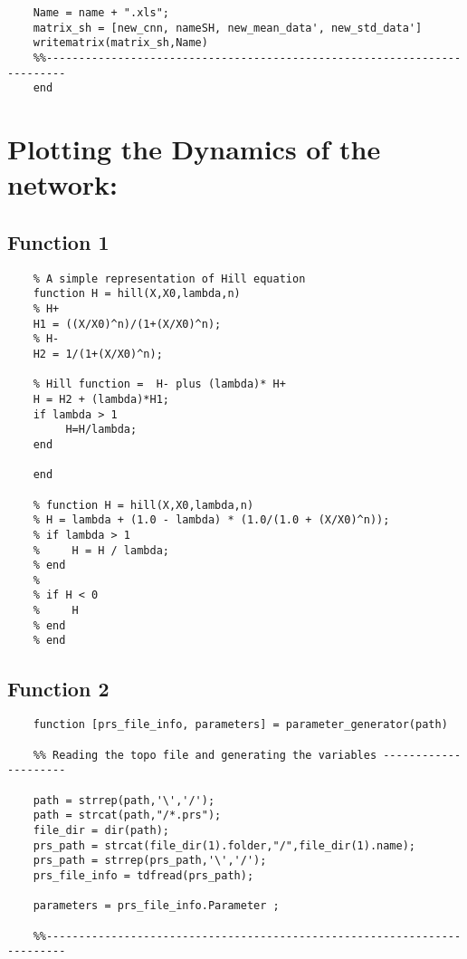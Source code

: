 \documentclass{article}
\begin{document}
\begin{verbatim}
    Name = name + ".xls";
    matrix_sh = [new_cnn, nameSH, new_mean_data', new_std_data']
    writematrix(matrix_sh,Name)
    %%-------------------------------------------------------------------------
    end
\end{verbatim}

\section*{Plotting the Dynamics of the network:}
\subsection*{Function 1}
\begin{verbatim}
    % A simple representation of Hill equation
    function H = hill(X,X0,lambda,n)
    % H+ 
    H1 = ((X/X0)^n)/(1+(X/X0)^n);
    % H-
    H2 = 1/(1+(X/X0)^n);
    
    % Hill function =  H- plus (lambda)* H+
    H = H2 + (lambda)*H1;
    if lambda > 1
         H=H/lambda;
    end
    
    end
    
    % function H = hill(X,X0,lambda,n)
    % H = lambda + (1.0 - lambda) * (1.0/(1.0 + (X/X0)^n));
    % if lambda > 1
    %     H = H / lambda;
    % end
    % 
    % if H < 0
    %     H
    % end
    % end
\end{verbatim}
\subsection*{Function 2}
\begin{verbatim}
    function [prs_file_info, parameters] = parameter_generator(path)

    %% Reading the topo file and generating the variables ---------------------
    
    path = strrep(path,'\','/');
    path = strcat(path,"/*.prs");
    file_dir = dir(path);
    prs_path = strcat(file_dir(1).folder,"/",file_dir(1).name);
    prs_path = strrep(prs_path,'\','/');
    prs_file_info = tdfread(prs_path);
    
    parameters = prs_file_info.Parameter ;
    
    %%-------------------------------------------------------------------------
\end{verbatim}
\end{document}
